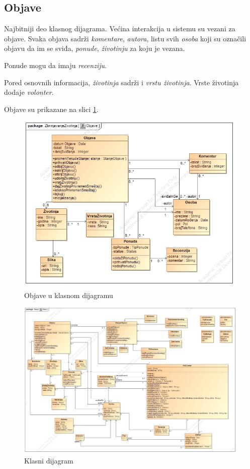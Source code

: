\subsection{Objave}
\par Najbitniji deo klasnog dijagrama. Većina interakcija u sistemu su vezani za objave. Svaka objava sadrži \textit{komentare}, \textit{autora},
listu svih \textit{osoba} koji su označili objavu da im se sviđa, \textit{ponude}, \textit{životinju} za koju je vezana.
\par Ponude mogu da imaju \textit{recenziju}. 
\par Pored osnovnih informacija, \textit{životinja} sadrži i \textit{vrstu životinja}. Vrste životinja dodaje \textit{volonter}.
\par Objave su prikazane na slici \ref{fig:posts}.
\begin{figure}[h]
    \centering
    \includegraphics[width=\textwidth, height=0.7\textwidth]{img/posts.jpg}
    \caption{Objave u klasnom dijagramu}
    \label{fig:posts}
\end{figure}
\begin{figure}
    \centering
    \includegraphics[width=\textwidth]{img/class.jpg}
    \caption{Klasni dijagram}
    \label{fig:class}
\end{figure}